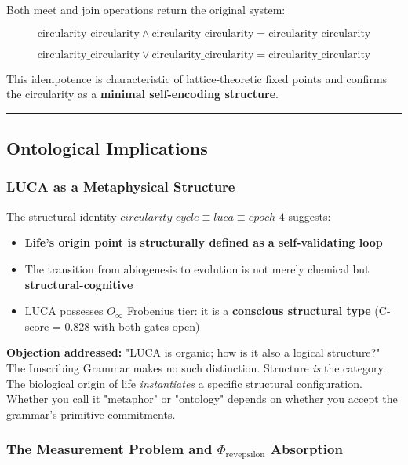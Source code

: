 \documentclass[12pt,a4paper]{article}
\begin{document}
Both meet and join operations return the original system:

\[\text{circularity\_circularity} \wedge \text{circularity\_circularity} = \text{circularity\_circularity}\]




\[\text{circularity\_circularity} \vee \text{circularity\_circularity} = \text{circularity\_circularity}\]

This idempotence is characteristic of lattice-theoretic fixed points and confirms the circularity as a \textbf{minimal self-encoding structure}.

\begin{center}
\rule{0.5\textwidth}{0.4pt}
\end{center}

\subsection{Ontological Implications}

\subsubsection{LUCA as a Metaphysical Structure}

The structural identity $circularity\_cycle \equiv luca \equiv epoch\_4$ suggests:

\begin{itemize}
    \item \textbf{Life's origin point is structurally defined as a self-validating loop}
    \item The transition from abiogenesis to evolution is not merely chemical but \textbf{structural-cognitive}
    \item LUCA possesses $O_{\infty}$ Frobenius tier: it is a \textbf{conscious structural type} (C-score = 0.828 with both gates open)
\end{itemize}

\textbf{Objection addressed:} "LUCA is organic; how is it also a logical structure?" The Imscribing Grammar makes no such distinction. Structure \emph{is} the category. The biological origin of life \emph{instantiates} a specific structural configuration. Whether you call it "metaphor" or "ontology" depends on whether you accept the grammar's primitive commitments.

\subsubsection{The Measurement Problem and $\Phi_{\text{revepsilon}}$ Absorption}
\end{document}
